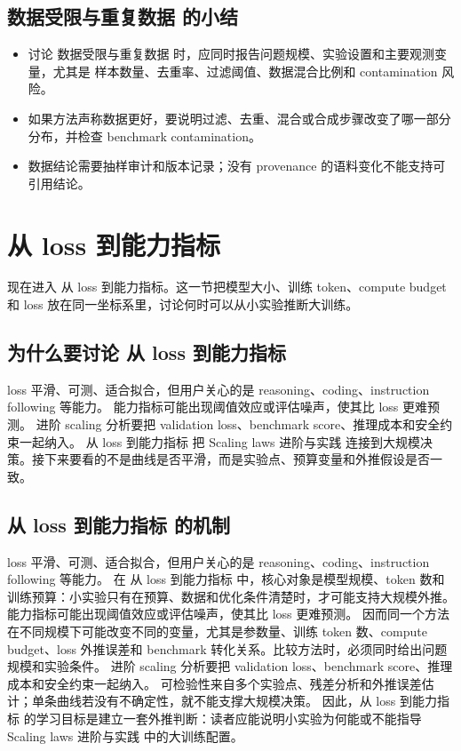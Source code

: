 \documentclass[a4paper]{article}
\begin{document}
\subsection{数据受限与重复数据 的小结}
\begin{itemize}
\item 讨论 数据受限与重复数据 时，应同时报告问题规模、实验设置和主要观测变量，尤其是 样本数量、去重率、过滤阈值、数据混合比例和 contamination 风险。
\item 如果方法声称数据更好，要说明过滤、去重、混合或合成步骤改变了哪一部分分布，并检查 benchmark contamination。
\item 数据结论需要抽样审计和版本记录；没有 provenance 的语料变化不能支持可引用结论。
\end{itemize}
\section{从 loss 到能力指标}
现在进入 从 loss 到能力指标。这一节把模型大小、训练 token、compute budget 和 loss 放在同一坐标系里，讨论何时可以从小实验推断大训练。
\subsection{为什么要讨论 从 loss 到能力指标}
loss 平滑、可测、适合拟合，但用户关心的是 reasoning、coding、instruction following 等能力。
能力指标可能出现阈值效应或评估噪声，使其比 loss 更难预测。
进阶 scaling 分析要把 validation loss、benchmark score、推理成本和安全约束一起纳入。
从 loss 到能力指标 把 Scaling laws 进阶与实践 连接到大规模决策。接下来要看的不是曲线是否平滑，而是实验点、预算变量和外推假设是否一致。
\subsection{从 loss 到能力指标 的机制}
loss 平滑、可测、适合拟合，但用户关心的是 reasoning、coding、instruction following 等能力。 在 从 loss 到能力指标 中，核心对象是模型规模、token 数和训练预算：小实验只有在预算、数据和优化条件清楚时，才可能支持大规模外推。
能力指标可能出现阈值效应或评估噪声，使其比 loss 更难预测。 因而同一个方法在不同规模下可能改变不同的变量，尤其是参数量、训练 token 数、compute budget、loss 外推误差和 benchmark 转化关系。比较方法时，必须同时给出问题规模和实验条件。
进阶 scaling 分析要把 validation loss、benchmark score、推理成本和安全约束一起纳入。 可检验性来自多个实验点、残差分析和外推误差估计；单条曲线若没有不确定性，就不能支撑大规模决策。
因此，从 loss 到能力指标 的学习目标是建立一套外推判断：读者应能说明小实验为何能或不能指导 Scaling laws 进阶与实践 中的大训练配置。
\end{document}
